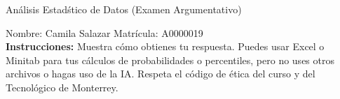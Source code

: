 \documentclass[8pt]{report}
\begin{document}
\newpage



\begin{center}
{An\'alisis Estad\'stico de Datos (Examen Argumentativo)}
\end{center}

Nombre: \underline{\hspace*{.2in}}
Camila Salazar
\underline{\hspace*{.2in}} \quad Matr\'icula:\underline{\hspace*{.2in}}
A0000019
\underline{\hspace*{.2in}} \\

{\bf Instrucciones:} Muestra c\'omo obtienes tu respuesta. Puedes usar Excel 
o Minitab para tus cálculos de probabilidades o 
percentiles, pero no uses otros archivos o hagas uso de la IA. Respeta el 
c\'odigo de \'etica del curso y del Tecnol\'ogico 
de Monterrey.
\end{document}
